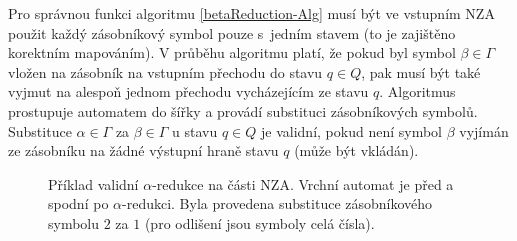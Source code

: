         Pro správnou funkci algoritmu \ref{betaReduction-Alg} musí být ve vstupním NZA použit každý zásobníkový symbol pouze s~jedním stavem (to je zajištěno korektním mapováním). V průběhu algoritmu platí, že pokud byl symbol $\beta \in \Gamma$ vložen na zásobník na vstupním přechodu do stavu $q \in Q$, pak musí být také vyjmut na alespoň jednom přechodu vycházejícím ze stavu $q$. Algoritmus prostupuje automatem do šířky a provádí substituci zásobníkových symbolů. Substituce $\alpha \in \Gamma$ za $\beta \in \Gamma$ u stavu $q \in Q$ je validní, pokud není symbol $\beta$ vyjímán ze zásobníku na žádné výstupní hraně stavu $q$ (může být vkládán).

        \begin{figure}[h]
            \centering
            \captionsetup{justification=justified}
            \caption{Příklad validní $\alpha$-redukce na části NZA. Vrchní automat je před a spodní po $\alpha$-redukci. Byla provedena substituce zásobníkového symbolu $2$ za $1$ (pro odlišení jsou symboly celá čísla).}
            \label{betaOkAtm}
          \end{figure}

          \vspace{-1cm}

